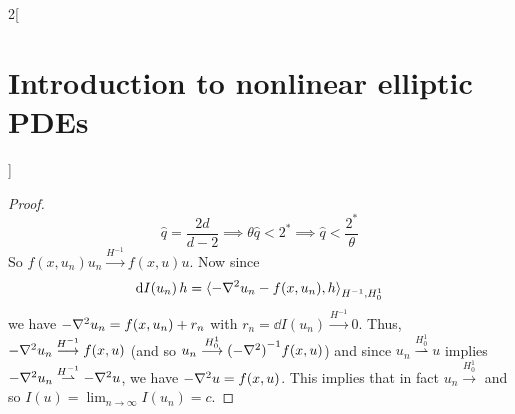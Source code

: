 \documentclass[../../../main_math.tex]{subfiles}
\begin{document}
\begin{multicols}{2}[\section{Introduction to nonlinear elliptic PDEs}]
\begin{proof}
    $$
      \hat{q}=\frac{2d}{d-2}\implies \theta\hat{q}<2^*\implies \hat{q}<\frac{2^*}{\theta}
    $$
    So $f(x,u_n)u_n\overset{H^{-1}}{\longrightarrow} f(x,u)u$. Now since
    $$
      \dd{I(u_n)}h={\langle -\laplacian u_n-f(x,u_n),h\rangle}_{H^{-1},H_0^1}
    $$
    we have $-\laplacian u_n=f(x,u_n)+r_n$ with $r_n=\dd{I(u_n)}\overset{H^{-1}}{\longrightarrow} 0$. Thus, $-\laplacian u_n\overset{H^{-1}}{\longrightarrow} f(x,u)$ (and so $u_n\overset{H_0^1}{\longrightarrow} {(-\laplacian)}^{-1}f(x,u)$) and since $u_n\overset{H_0^1}{\rightharpoonup} u$ implies $-\laplacian u_n\overset{H^{-1}}{\rightharpoonup} -\laplacian u$, we have $-\laplacian u=f(x,u)$. This implies that in fact $u_n\overset{H_0^1}{\longrightarrow}$ and so $I(u)=\displaystyle \lim_{n\to\infty}I(u_n)=c$.
  \end{proof}
\end{multicols}
\end{document}
